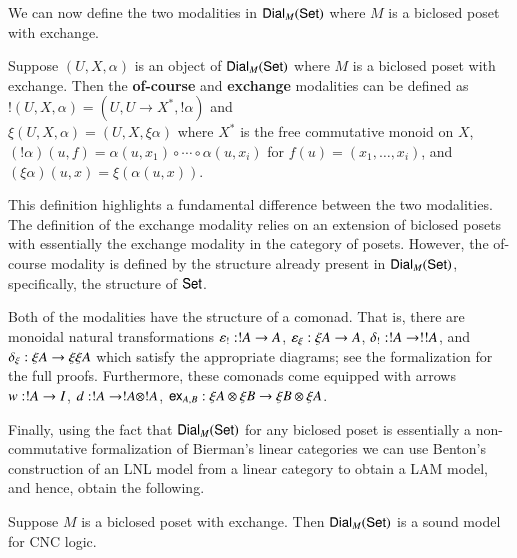 We can now define the two modalities in $\mathsf{Dial}_{M}(\mathsf{Set})$ where $M$ is
a biclosed poset with exchange.
\begin{definition}
  \label{def:modalities-dial}
  Suppose $(U, X, \alpha)$ is an object of $\mathsf{Dial}_{M}(\mathsf{Set})$ where $M$
  is a biclosed poset with exchange. Then the \textbf{of-course} and
  \textbf{exchange} modalities can be defined as 
  $! (U, X, \alpha) = (U, U \to X^*, !\alpha)$ and \\
  $\xi (U, X, \alpha) = (U, X, \xi \alpha)$
  where $X^*$ is the free commutative monoid on $X$, $(!\alpha)(u, f)
  = \alpha(u, x_1) \circ \cdots \circ \alpha(u, x_i)$ for $f(u) =
  (x_1, \ldots, x_i)$, and $(\xi \alpha)(u, x) = \xi (\alpha(u,
  x))$.
\end{definition}
This definition highlights a fundamental difference between the two
modalities.  The definition of the exchange modality relies on an
extension of biclosed posets with essentially the exchange modality in
the category of posets.  However, the of-course modality is defined by
the structure already present in $\mathsf{Dial}_{M}(\mathsf{Set})$, specifically, the
structure of $\mathsf{Set}$.

Both of the modalities have the structure of a comonad.  That is,
there are monoidal natural transformations $\varepsilon_! : !A \rightarrow
A$, $\varepsilon_\xi : \xi A \rightarrow A$, $\delta_! : !A \rightarrow !!A$,
and $\delta_\xi : \xi A \rightarrow \xi\xi A$ which satisfy the
appropriate diagrams; see the formalization for the full
proofs. Furthermore, these comonads come equipped with arrows $w : !A
\rightarrow I$, $d : !A \rightarrow !A \otimes !A$, $\mathsf{ex}_{A,B} : \xi A \otimes \xi B \rightarrow \xi B
\otimes \xi A$. 

Finally, using the fact that $\mathsf{Dial}_{M}(\mathsf{Set})$ for any biclosed poset
is essentially a non-commutative formalization of Bierman's linear
categories \cite{Bierman:1994} we can use Benton's construction of an
LNL model from a linear category to obtain a LAM model, and hence,
obtain the following.
\begin{theorem}
  \label{theorem:sound-dial-exchange-!}
  Suppose $M$ is a biclosed poset with exchange.  Then
  $\mathsf{Dial}_{M}(\mathsf{Set})$ is a sound model for CNC logic.
\end{theorem}


